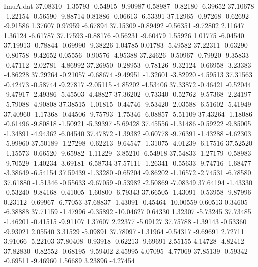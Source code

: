 \begin{filecontents}{ImuA.dat}
  37.08310   -1.35793   -0.54915   -9.90987    0.58987   -0.82180   -6.39652
  37.10678   -1.22154   -0.56590   -9.88714    0.81886   -0.06613   -6.53391
  37.12965   -0.97268   -0.62692   -9.91586    1.37607    0.97959   -6.67894
  37.15309   -0.89492   -0.56351   -9.72802    2.11647    1.36124   -6.61787
  37.17593   -0.88176   -0.56231   -9.60479    1.55926    1.01775   -6.04540
  37.19913   -0.78844   -0.69990   -9.38226    1.04785    0.01783   -5.49582
  37.22311   -0.63290   -0.80758   -9.42652    0.05556   -0.90576   -4.95388
  37.24626   -0.50967   -0.79920   -9.35833   -0.47112   -2.02781   -4.86992
  37.26950   -0.28953   -0.78126   -9.32124   -0.66958   -3.23383   -4.86228
  37.29264   -0.21057   -0.68674   -9.49951   -1.32601   -3.82920   -4.59513
  37.31563   -0.42473   -0.58744   -9.27817   -2.05115   -4.85202   -4.53406
  37.33872   -0.46421   -0.52044   -9.47917   -2.49386   -5.45503   -4.48827
  37.36202   -0.73340   -0.52762   -9.57368   -2.24197   -5.79088   -4.90808
  37.38515   -1.01815   -0.44746   -9.53420   -2.03588   -6.51602   -5.41949
  37.40960   -1.17368   -0.44506   -9.75793   -1.75346   -6.08857   -5.51109
  37.43264   -1.18086   -0.61496   -9.80818   -1.50921   -5.39397   -5.69428
  37.45556   -1.31486   -0.59222   -9.85005   -1.34891   -4.94362   -6.04540
  37.47872   -1.39382   -0.60778   -9.76391   -1.43288   -4.62303   -5.99960
  37.50189   -1.27298   -0.62213   -9.64547   -1.31075   -4.01239   -6.17516
  37.52520   -1.15573   -0.66520   -9.65982   -1.11229   -3.85210   -6.54918
  37.54833   -1.27179   -0.58983   -9.70529   -1.40234   -3.69181   -6.58734
  37.57111   -1.26341   -0.55633   -9.74716   -1.68477   -3.38649   -6.54154
  37.59439   -1.33280   -0.65204   -9.86202   -1.16572   -2.74531   -6.78580
  37.61880   -1.51346   -0.55633   -9.67059   -0.53982   -2.50869   -7.08349
  37.64194   -1.43330   -0.53240   -9.84168   -0.41005   -1.60800   -6.79343
  37.66505   -1.43091   -0.53958   -9.87996    0.23112   -0.69967   -6.77053
  37.68837   -1.43091   -0.45464  -10.00559    0.60513    0.34605   -6.38888
  37.71159   -1.47996   -0.35892  -10.04627    0.64330    1.32307   -5.73245
  37.73485   -1.46201   -0.41515   -9.91107    1.37607    2.22377   -5.09127
  37.75788   -1.39143   -0.53360   -9.93021    2.05540    3.31529   -5.09891
  37.78097   -1.31964   -0.54317   -9.69691    2.72711    3.91066   -5.22103
  37.80408   -0.93918   -0.62213   -9.69691    2.55155    4.14728   -4.82412
  37.82830   -0.82552   -0.68195   -9.59402    2.45995    4.07095   -4.77069
  37.85139   -0.59342   -0.69511   -9.46960    1.56689    3.23896   -4.27454

\end{filecontents}

